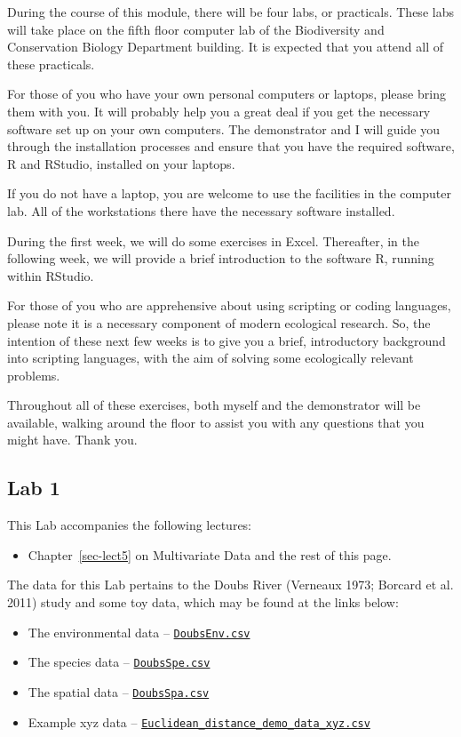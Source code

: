 \documentclass[
  11pt,
]{book}
\providecommand{\tightlist}{%
  \setlength{\itemsep}{0pt}\setlength{\parskip}{0pt}}
\let\oldtexttt\texttt
\renewcommand{\texttt}[1]{\oldtexttt{\small #1}}
\begin{document}
During the course of this module, there will be four labs, or
practicals. These labs will take place on the fifth floor computer lab
of the Biodiversity and Conservation Biology Department building. It is
expected that you attend all of these practicals.

For those of you who have your own personal computers or laptops, please
bring them with you. It will probably help you a great deal if you get
the necessary software set up on your own computers. The demonstrator
and I will guide you through the installation processes and ensure that
you have the required software, R and RStudio, installed on your
laptops.

If you do not have a laptop, you are welcome to use the facilities in
the computer lab. All of the workstations there have the necessary
software installed.

During the first week, we will do some exercises in Excel. Thereafter,
in the following week, we will provide a brief introduction to the
software R, running within RStudio.

For those of you who are apprehensive about using scripting or coding
languages, please note it is a necessary component of modern ecological
research. So, the intention of these next few weeks is to give you a
brief, introductory background into scripting languages, with the aim of
solving some ecologically relevant problems.

Throughout all of these exercises, both myself and the demonstrator will
be available, walking around the floor to assist you with any questions
that you might have. Thank you.

\subsection{Lab 1}\label{lab-1}

This Lab accompanies the following lectures:

\begin{itemize}
\tightlist
\item
  Chapter~\ref{sec-lect5} on Multivariate Data and the rest of this
  page.
\end{itemize}

The data for this Lab pertains to the Doubs River (Verneaux 1973;
Borcard et al. 2011) study and some toy data, which may be found at the
links below:

\begin{itemize}
\tightlist
\item
  The environmental data --
  \href{../data/DoubsEnv.csv}{\texttt{DoubsEnv.csv}}
\item
  The species data -- \href{../data/DoubsSpe.csv}{\texttt{DoubsSpe.csv}}
\item
  The spatial data -- \href{../data/DoubsSpa.csv}{\texttt{DoubsSpa.csv}}
\item
  Example xyz data --
  \href{../data/Euclidean_distance_demo_data_xyz.csv}{\texttt{Euclidean\_distance\_demo\_data\_xyz.csv}}
\end{itemize}
\end{document}
